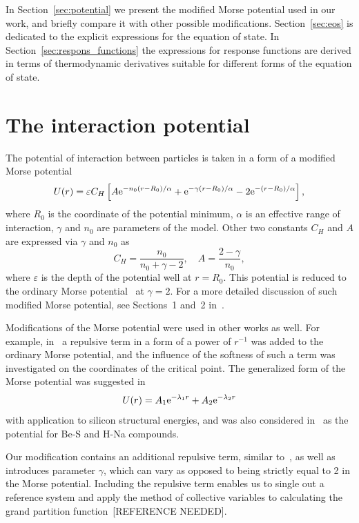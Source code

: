 \documentclass[12pt]{article}
\begin{document}
	In Section~\ref{sec:potential} we present the modified Morse potential used in our work, and briefly compare it with other possible modifications. Section~\ref{sec:eos} is dedicated to the explicit expressions for the equation of state. In Section~\ref{sec:respons_functions} the expressions for response functions are derived in terms of thermodynamic derivatives suitable for different forms of the equation of state.

	
	\section{\label{sec:potential}The interaction potential}
	The potential of interaction between particles is taken in a form of a modified Morse potential
	\begin{equation}
		\label{def:mod_morse}
		U(r) = \varepsilon C_{H} \left[A {\rm e}^{-n_0(r-R_0)/\alpha} + {\rm e}^{-\gamma(r - R_0)/\alpha} -2{\rm e}^{-(r-R_0)/\alpha}\right],
	\end{equation}
	where $R_0$ is the coordinate of the potential minimum, $\alpha$ is an effective range of interaction, $\gamma$ and $n_0$ are parameters of the model. Other two constants $C_{H}$ and $A$ are expressed via $\gamma$ and $n_0$ as
	\begin{equation}
		C_{H} = \frac{n_0}{n_0 + \gamma - 2}, \quad A = \frac{2 - \gamma}{n_0},
	\end{equation}
	where $\varepsilon$ is the depth of the potential well at $r=R_0$. This potential is reduced to the ordinary Morse potential~\cite{Morse1929} at $\gamma=2$. For a more detailed discussion of such modified Morse potential, see Sections~1 and~2 in~\cite{KozlovskiiDobush2020}.
	
	Modifications of the Morse potential were used in other works as well. For example, in~\cite{MartinezValenciaEtAl2013} a repulsive term in a form of a power of $r^{-1}$ was added to the ordinary Morse potential, and the influence of the softness of such a term was investigated on the coordinates of the critical point. The generalized form of the Morse potential was suggested in~\cite{BiswasHamann1985}
	\begin{equation}
		U(r) = A_1 {\rm e}^{-\lambda_1 r} + A_2 {\rm e}^{-\lambda_2 r}
	\end{equation} 
	with application to silicon structural energies, and was also considered in~\cite{Lim2005} as the potential for Be-S and H-Na compounds.
	
	Our modification contains an additional repulsive term, similar to~\cite{MartinezValenciaEtAl2013}, as well as introduces parameter $\gamma$, which can vary as opposed to being strictly equal to 2 in the Morse potential. Including the repulsive term enables us to single out a reference system and apply the method of collective variables to calculating the grand partition function~[REFERENCE NEEDED].
	
\end{document}
